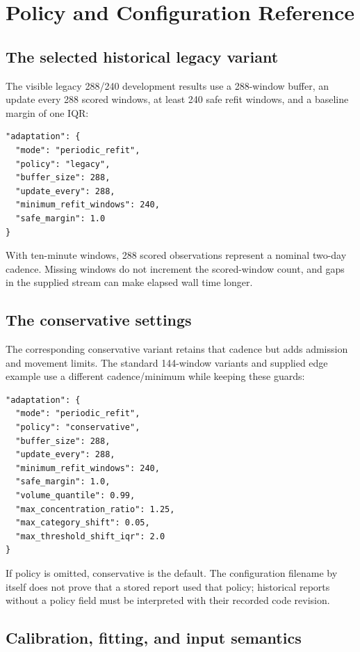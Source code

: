 \section{Policy and Configuration Reference}

\subsection{The selected historical legacy variant}

The visible legacy 288/240 development results use a 288-window buffer,
an update every 288 scored windows, at least 240 safe refit windows,
and a baseline margin of one IQR:

\begin{verbatim}
"adaptation": {
  "mode": "periodic_refit",
  "policy": "legacy",
  "buffer_size": 288,
  "update_every": 288,
  "minimum_refit_windows": 240,
  "safe_margin": 1.0
}
\end{verbatim}

With ten-minute windows, 288 scored observations represent a nominal two-day
cadence. Missing windows do not increment the scored-window count, and gaps in
the supplied stream can make elapsed wall time longer.

\subsection{The conservative settings}

The corresponding conservative variant retains that cadence but adds admission
and movement limits. The standard 144-window variants and supplied edge example
use a different cadence/minimum while keeping these guards:

\begin{verbatim}
"adaptation": {
  "mode": "periodic_refit",
  "policy": "conservative",
  "buffer_size": 288,
  "update_every": 288,
  "minimum_refit_windows": 240,
  "safe_margin": 1.0,
  "volume_quantile": 0.99,
  "max_concentration_ratio": 1.25,
  "max_category_shift": 0.05,
  "max_threshold_shift_iqr": 2.0
}
\end{verbatim}

If policy is omitted, conservative is the default. The configuration filename
by itself does not prove that a stored report used that policy; historical
reports without a policy field must be interpreted with their recorded code
revision.

\subsection{Calibration, fitting, and input semantics}

